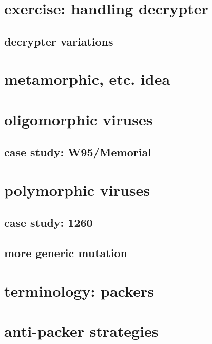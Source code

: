 \section{exercise: handling decrypter}



\subsection{decrypter variations}


\section{metamorphic, etc. idea}


\section{oligomorphic viruses}


\subsection{case study: W95/Memorial}


\section{polymorphic viruses}


\subsection{case study: 1260}


\subsection{more generic mutation}


\section{terminology: packers}


\section{anti-packer strategies} %
